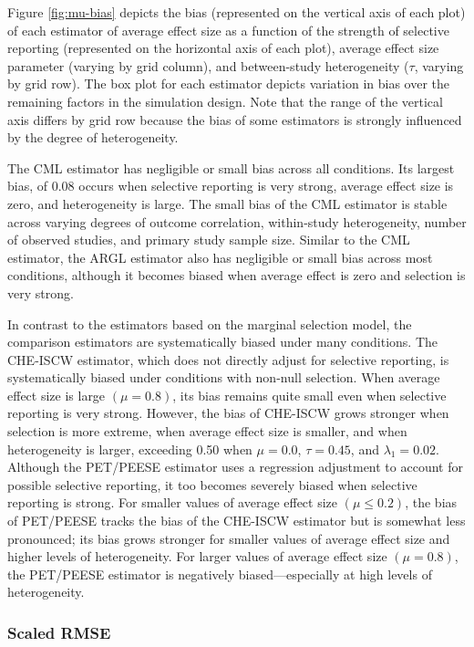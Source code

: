 \documentclass[
  man, donotrepeattitle,floatsintext]{apa7}
\begin{document}
Figure \ref{fig:mu-bias} depicts the bias (represented on the vertical axis of each plot) of each estimator of average effect size as a function of the strength of selective reporting (represented on the horizontal axis of each plot), average effect size parameter (varying by grid column), and between-study heterogeneity (\(\tau\), varying by grid row).
The box plot for each estimator depicts variation in bias over the remaining factors in the simulation design.
Note that the range of the vertical axis differs by grid row because the bias of some estimators is strongly influenced by the degree of heterogeneity.

The CML estimator has negligible or small bias across all conditions.
Its largest bias, of 0.08 occurs when selective reporting is very strong, average effect size is zero, and heterogeneity is large.
The small bias of the CML estimator is stable across varying degrees of outcome correlation, within-study heterogeneity, number of observed studies, and primary study sample size.
Similar to the CML estimator, the ARGL estimator also has negligible or small bias across most conditions, although it becomes biased when average effect is zero and selection is very strong.

In contrast to the estimators based on the marginal selection model, the comparison estimators are systematically biased under many conditions.
The CHE-ISCW estimator, which does not directly adjust for selective reporting, is systematically biased under conditions with non-null selection.
When average effect size is large \((\mu = 0.8)\), its bias remains quite small even when selective reporting is very strong.
However, the bias of CHE-ISCW grows stronger when selection is more extreme, when average effect size is smaller, and when heterogeneity is larger, exceeding 0.50 when \(\mu = 0.0\), \(\tau = 0.45\), and \(\lambda_1 = 0.02\).
Although the PET/PEESE estimator uses a regression adjustment to account for possible selective reporting, it too becomes severely biased when selective reporting is strong.
For smaller values of average effect size \((\mu \leq 0.2)\), the bias of PET/PEESE tracks the bias of the CHE-ISCW estimator but is somewhat less pronounced; its bias grows stronger for smaller values of average effect size and higher levels of heterogeneity.
For larger values of average effect size \((\mu = 0.8)\), the PET/PEESE estimator is negatively biased---especially at high levels of heterogeneity.

\subsubsection{Scaled RMSE}\label{scaled-rmse}
\end{document}
